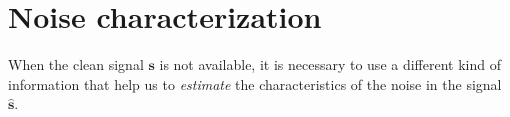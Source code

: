 










\section{Noise characterization}

When the clean signal $\mathbf{s}$ is not available, it is necessary
to use a different kind of information that help us to \emph{estimate}
the characteristics of the noise in the signal $\hat{\mathbf{s}}$.

